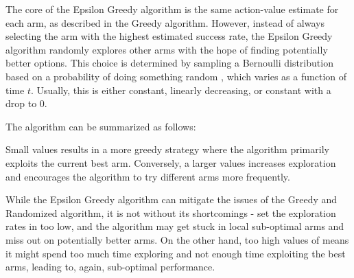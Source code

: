 The core of the Epsilon Greedy algorithm is the same action-value estimate for each arm, as described in the Greedy algorithm. However, instead of always selecting the arm with the highest estimated success rate, the Epsilon Greedy algorithm randomly explores other arms with the hope of finding potentially better options. This choice is determined by sampling a Bernoulli distribution based on a probability of doing something random \epsilonFunction, which varies as a function of time $t$. Usually, this is either constant, linearly decreasing, or constant with a drop to 0.


The algorithm can be summarized as follows:


Small \epsilonFunction values results in a more greedy strategy where the algorithm primarily exploits the current best arm. Conversely, a larger  \epsilonFunction values increases exploration and encourages the algorithm to try different arms more frequently.

While the Epsilon Greedy algorithm can mitigate the issues of the Greedy and Randomized algorithm, it is not without its shortcomings - set the exploration rates in \epsilonFunction too low, and the algorithm may get stuck in local sub-optimal arms and miss out on potentially better arms. On the other hand, too high values of \epsilonFunction means it might spend too much time exploring and not enough time exploiting the best arms, leading to, again, sub-optimal performance.

